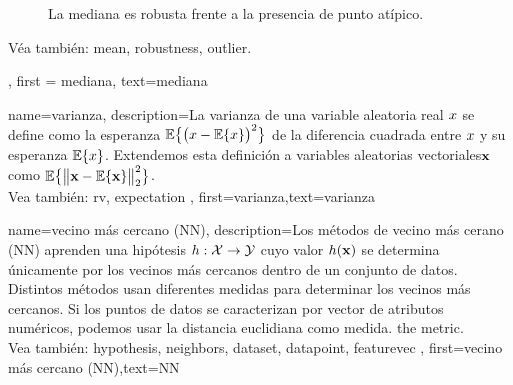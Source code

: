 {{\begin{figure}
		\caption{La mediana es robusta frente a la presencia de punto atípico.}
	\end{figure}
	Véa también: \gls{mean}, \gls{robustness}, \gls{outlier}.}, 
	first = {mediana}, 
	text={mediana} 
}


{
	name={varianza},
	description={La varianza de una variable aleatoria real $x$ se define como la esperanza
		$\mathbb{E}\big\{ \big( x - \mathbb{E}\{x \} \big)^{2} \big\}$ de la diferencia cuadrada entre $x$ 
		y su esperanza $\mathbb{E}\{x \}$. Extendemos esta definición a variables aleatorias vectoriales${\bf x}$ 
		como $\mathbb{E}\big\{ \big\| {\bf x} - \mathbb{E}\{{\bf x} \} \big\|_{2}^{2} \big\}$.
		\\
		Vea también: \gls{rv}, \gls{expectation} } ,
		first={varianza},text={varianza} 
}

{
	name={vecino más cercano (NN)},
	description={Los métodos de vecino más cerano (NN) aprenden una hipótesis
		$h: \mathcal{X} \rightarrow \mathcal{Y}$ cuyo valor $h({\bf x})$ 
		se determina únicamente por los vecinos más cercanos dentro de un conjunto de datos. Distintos 
		métodos usan diferentes medidas para determinar los vecinos más cercanos. Si los puntos de datos
		se caracterizan por vector de atributos numéricos, podemos usar la distancia euclidiana como medida.  
		the metric.
		\\
		Vea también: \gls{hypothesis}, \gls{neighbors}, \gls{dataset}, \gls{datapoint}, \gls{featurevec} },
	first={vecino más cercano (NN)},text={NN} 
}


